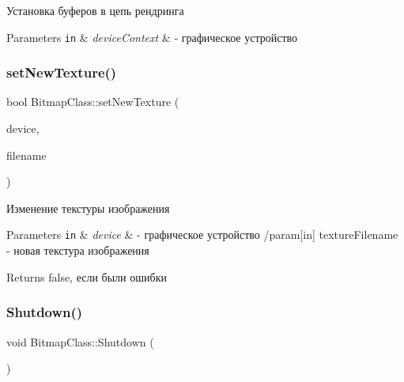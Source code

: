 Установка буферов в цепь рендринга 


\begin{DoxyParams}[1]{Parameters}
\mbox{\tt in}  & {\em device\+Context} & -\/ графическое устройство \\
\hline
\end{DoxyParams}
\mbox{\label{class_bitmap_class_a08e06db84ba1088a4eaa145ef8b1cd6c}} 
\subsubsection{\texorpdfstring{set\+New\+Texture()}{setNewTexture()}}
{\footnotesize\ttfamily bool Bitmap\+Class\+::set\+New\+Texture (\begin{DoxyParamCaption}\item[{I\+D3\+D11\+Device $\ast$}]{device,  }\item[{\hyperlink{class_path_class}{Path\+Class} $\ast$}]{filename }\end{DoxyParamCaption})}



Изменение текстуры изображения 


\begin{DoxyParams}[1]{Parameters}
\mbox{\tt in}  & {\em device} & -\/ графическое устройство /param\mbox{[}in\mbox{]} texture\+Filename -\/ новая текстура изображения \\
\hline
\end{DoxyParams}
\begin{DoxyReturn}{Returns}
false, если были ошибки 
\end{DoxyReturn}
\mbox{\label{class_bitmap_class_a5d8c2363514af59acd8c2f3ee042294b}} 
\subsubsection{\texorpdfstring{Shutdown()}{Shutdown()}}
{\footnotesize\ttfamily void Bitmap\+Class\+::\+Shutdown (\begin{DoxyParamCaption}{ }\end{DoxyParamCaption})}

\mbox{\label{class_bitmap_class_a9c3f2964ac428afbb0f448262a9d7489}} 

